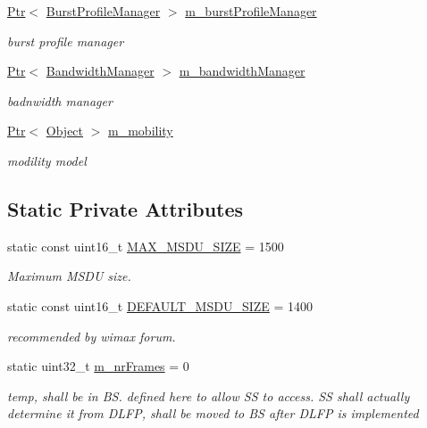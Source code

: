 \begin{DoxyCompactItemize}
\hyperlink{classns3_1_1Ptr}{Ptr}$<$ \hyperlink{classns3_1_1BurstProfileManager}{Burst\+Profile\+Manager} $>$ \hyperlink{classns3_1_1WimaxNetDevice_a11d983c009fb78f70e01b67a06400e8f}{m\+\_\+burst\+Profile\+Manager}
\begin{DoxyCompactList}\small\item\em burst profile manager \end{DoxyCompactList}\item 
\hyperlink{classns3_1_1Ptr}{Ptr}$<$ \hyperlink{classns3_1_1BandwidthManager}{Bandwidth\+Manager} $>$ \hyperlink{classns3_1_1WimaxNetDevice_a109ed0791e501c8380b9d683d0412ac1}{m\+\_\+bandwidth\+Manager}
\begin{DoxyCompactList}\small\item\em badnwidth manager \end{DoxyCompactList}\item 
\hyperlink{classns3_1_1Ptr}{Ptr}$<$ \hyperlink{classns3_1_1Object}{Object} $>$ \hyperlink{classns3_1_1WimaxNetDevice_a72ed49e7fabcbe937734131a3833457f}{m\+\_\+mobility}
\begin{DoxyCompactList}\small\item\em modility model \end{DoxyCompactList}\end{DoxyCompactItemize}
\subsection*{Static Private Attributes}
\begin{DoxyCompactItemize}
\item 
static const uint16\+\_\+t \hyperlink{classns3_1_1WimaxNetDevice_a4f1da5fb6800bef6601b6620b69ac794}{M\+A\+X\+\_\+\+M\+S\+D\+U\+\_\+\+S\+I\+ZE} = 1500
\begin{DoxyCompactList}\small\item\em Maximum M\+S\+DU size. \end{DoxyCompactList}\item 
static const uint16\+\_\+t \hyperlink{classns3_1_1WimaxNetDevice_a44af15469163327b9d5e8aab937b6df0}{D\+E\+F\+A\+U\+L\+T\+\_\+\+M\+S\+D\+U\+\_\+\+S\+I\+ZE} = 1400
\begin{DoxyCompactList}\small\item\em recommended by wimax forum. \end{DoxyCompactList}\item 
static uint32\+\_\+t \hyperlink{classns3_1_1WimaxNetDevice_aa0ebae2f077c1c1a422a4dc97cc83be4}{m\+\_\+nr\+Frames} = 0
\begin{DoxyCompactList}\small\item\em temp, shall be in BS. defined here to allow SS to access. SS shall actually determine it from D\+L\+FP, shall be moved to BS after D\+L\+FP is implemented \end{DoxyCompactList}\end{DoxyCompactItemize}
